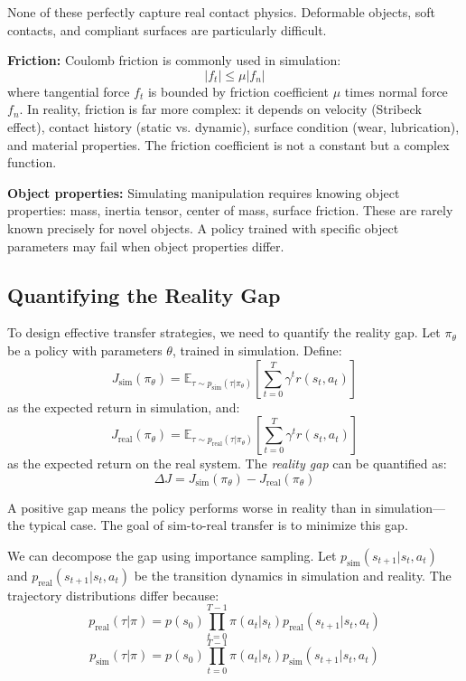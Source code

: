 None of these perfectly capture real contact physics. Deformable objects, soft contacts, and compliant surfaces are particularly difficult.

\textbf{Friction:} Coulomb friction is commonly used in simulation:
\begin{equation}
|f_t| \leq \mu |f_n|
\end{equation}
where tangential force $f_t$ is bounded by friction coefficient $\mu$ times normal force $f_n$. In reality, friction is far more complex: it depends on velocity (Stribeck effect), contact history (static vs. dynamic), surface condition (wear, lubrication), and material properties. The friction coefficient is not a constant but a complex function.

\textbf{Object properties:} Simulating manipulation requires knowing object properties: mass, inertia tensor, center of mass, surface friction. These are rarely known precisely for novel objects. A policy trained with specific object parameters may fail when object properties differ.

\subsection{Quantifying the Reality Gap}

To design effective transfer strategies, we need to quantify the reality gap. Let $\pi_\theta$ be a policy with parameters $\theta$, trained in simulation. Define:
\begin{equation}
J_{\text{sim}}(\pi_\theta) = \mathbb{E}_{\tau \sim p_{\text{sim}}(\tau | \pi_\theta)} \left[ \sum_{t=0}^{T} \gamma^t r(s_t, a_t) \right]
\end{equation}
as the expected return in simulation, and:
\begin{equation}
J_{\text{real}}(\pi_\theta) = \mathbb{E}_{\tau \sim p_{\text{real}}(\tau | \pi_\theta)} \left[ \sum_{t=0}^{T} \gamma^t r(s_t, a_t) \right]
\end{equation}
as the expected return on the real system. The \textit{reality gap} can be quantified as:
\begin{equation}
\Delta J = J_{\text{sim}}(\pi_\theta) - J_{\text{real}}(\pi_\theta)
\label{eq:reality_gap}
\end{equation}

A positive gap means the policy performs worse in reality than in simulation---the typical case. The goal of sim-to-real transfer is to minimize this gap.

We can decompose the gap using importance sampling. Let $p_{\text{sim}}(s_{t+1} | s_t, a_t)$ and $p_{\text{real}}(s_{t+1} | s_t, a_t)$ be the transition dynamics in simulation and reality. The trajectory distributions differ because:
\begin{equation}
p_{\text{real}}(\tau | \pi) = p(s_0) \prod_{t=0}^{T-1} \pi(a_t | s_t) p_{\text{real}}(s_{t+1} | s_t, a_t)
\end{equation}
\begin{equation}
p_{\text{sim}}(\tau | \pi) = p(s_0) \prod_{t=0}^{T-1} \pi(a_t | s_t) p_{\text{sim}}(s_{t+1} | s_t, a_t)
\end{equation}

